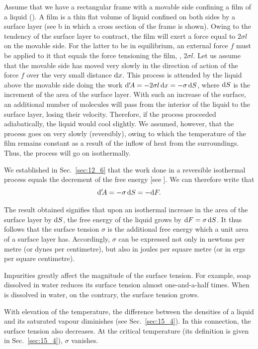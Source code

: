 Assume that we have a rectangular frame with a movable side confining a film of a liquid (). A film is a thin flat volume of liquid confined on both sides by a surface layer (see b in which a cross section of the frame is shown). Owing to the tendency of the surface layer to contract, the film will exert a force equal to $2\sigma l$ on the movable side. For the latter to be in equilibrium, an external force $f$ must be applied to it that equals the force tensioning the film, \ie, $2\sigma l$. Let us assume that the movable side has moved very slowly in the direction of action of the force $f$ over the very small distance $\mathrm{d} x$. This process is attended by the liquid above the movable side doing the work $\mathrm{d}'\!A=-2\sigma l\,\mathrm{d} x=-\sigma\,\mathrm{d} S$, where $\mathrm{d} S$ is the increment of the area of the surface layer. With such an increase of the surface, an additional number of molecules will pass from the interior of the liquid to the surface layer, losing their velocity. Therefore, if the process proceeded adiabatically, the liquid would cool slightly. We assumed, however, that the process goes on very slowly (reversibly), owing to which the temperature of the film remains constant as a result of the inflow of heat from the surroundings. Thus, the process will go on isothermally.

We established in Sec.~\ref{sec:12_6} that the work done in a reversible isothermal process equals the decrement of the free energy [see ]. We can therefore write that
\begin{equation*}
	\mathrm{d}'\!A = -\sigma\,\mathrm{d} S = -\mathrm{d} F.
\end{equation*}

\noindent
The result obtained signifies that upon an isothermal increase in the area of the surface layer by $\mathrm{d} S$, the free energy of the liquid grows by $\mathrm{d} F=\sigma\,\mathrm{d} S$. It thus follows that the surface tension $\sigma$ is the additional free energy which a unit area of a surface layer has. Accordingly, $\sigma$ can be expressed not only in newtons per metre (or dynes per centimetre), but also in joules per square metre (or in ergs per square centimetre).

Impurities greatly affect the magnitude of the surface tension. For example, soap dissolved in water reduces its surface tension almost one-and-a-half times. When  is dissolved in water, on the contrary, the surface tension grows.

With elevation of the temperature, the difference between the densities of a liquid and its saturated vapour diminishes (see Sec.~\ref{sec:15_4}). In this connection, the surface tension also decreases. At the critical temperature (its definition is given in Sec.~\ref{sec:15_4}), $\sigma$ vanishes.


